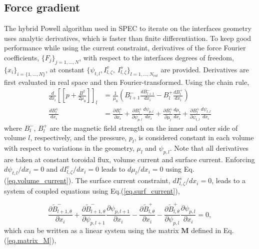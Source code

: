 \documentclass[my_thesis.tex]{subfiles}
\begin{document}
\subsection{Force gradient}
\label{sec. force gradient}
The hybrid Powell algorithm used in SPEC to iterate on the interfaces geometry uses analytic derivatives, which is faster than finite differentiation. To keep good performance while using the current constraint, derivatives of the force Fourier coefficients, $\{F_j\}_{j=1,\ldots,N}$, with respect to the interfaces degrees of freedom, $\{x_i\}_{i=\{1,\ldots,N\}}$, at constant $\{\psi_{t,l}, I^v_{l,\zeta},\ I^s_{l,\zeta}\}_{l=1,\ldots,N_{vol}}$ are provided. Derivatives are first evaluated in real space and then Fourier-transformed. Using the chain rule,
\begin{align}
	\frac{d}{d x_i}\left[\left[p + \frac{B^2}{2\mu_0}\right]\right]_l &= \frac{1}{\mu_0}\left( B^-_{l+1}\frac{d B^-_{l+1}}{d x_i} - B^+_l \frac{d B^+_{l}}{d x_i}\right)\\ \label{eq.force_gradient}
	\frac{d B^{\pm}_l}{d x_i} &= \frac{\partial B^\pm_l}{\partial x_i} + \frac{\partial B^\pm_l}{\partial \psi_{p,l}}\frac{d \psi_{p,l}}{d x_i} + \frac{\partial B^\pm_l}{\partial \mu_l}\frac{d\mu_l}{d x_i}+ \frac{\partial B^\pm_l}{\partial \psi_{t,l}}\frac{d\psi_{t,l}}{d x_i}
\end{align}
where $B^-_l$, $B^+_l$ are the magnetic field strength on the inner and outer side of volume $l$, respectively, and the pressure, $p_l$, is considered constant in each volume with respect to variations in the geometry, $\mu_l$ and $\psi_{p,l}$. Note that all derivatives are taken at constant toroidal flux, volume current and surface current. Enforcing $ d\psi_{t,l} / dx_i=0$ and $d I^v_{l,\zeta} / dx_i=0$ leads to $d \mu_l/dx_i=0$ using Eq.(\ref{eq.volume_current}). The surface current constraint, $d I^s_{l,\zeta}/dx_i=0$, leads to a system of coupled equations using Eq.(\ref{eq.surf_current}),

\begin{equation}
	\frac{\partial \tilde{B}^-_{l+1,\theta}}{\partial x_i} + \frac{\partial \tilde{B}^-_{l+1,\theta}}{\partial \psi_{p,l+1}} \frac{\partial\psi_{p,l+1}}{\partial x_i} - \frac{\partial \tilde{B}^+_{l,\theta}}{\partial x_i} - \frac{\partial \tilde{B}^+_{l,\theta}}{\partial \psi_{p,l}}\frac{\partial\psi_{p,l}}{\partial x_i} = 0, \label{eq.Isurface_derivative}
\end{equation}
which can be written as a linear system using the matrix $\mathbf{M}$ defined in Eq.(\ref{eq.matrix_M}),
\end{document}
